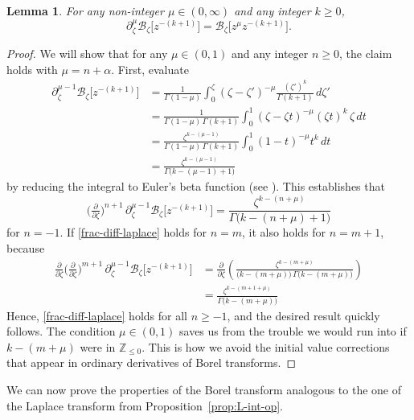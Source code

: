 \documentclass{article}
\newcommand{\Z}{\mathbb{Z}}
\newcommand{\borel}{\mathcal{B}}
\theoremstyle{definition}
\theoremstyle{plain}
\newtheorem{lemma}[definition]{Lemma}
\begin{document}
\begin{lemma}\label{lem:frac-deriv-Borel}
For any non-integer $\mu \in (0, \infty)$ and any integer $k \ge 0$,
\[ \partial^\mu_{\zeta } \borel_\zeta \big[z^{-(k+1)}\big] =  \borel_\zeta \big[z^\mu z^{-(k+1)}\big]. \]
\end{lemma}
\begin{proof}
We will show that for any $\mu \in (0, 1)$ and any integer $n \ge 0$, the claim holds with $\mu = n + \alpha$. First, evaluate
\begin{align*}
\partial^{\mu-1}_{\zeta} \borel_\zeta \big[z^{-(k+1)}\big] & = \frac{1}{\Gamma(1-\mu)} \int_0^\zeta (\zeta-\zeta')^{-\mu} \frac{(\zeta')^k}{\Gamma(k+1)}\,d\zeta' \\
& = \frac{1}{\Gamma(1-\mu)\,\Gamma(k+1)} \int_0^1 (\zeta-\zeta t)^{-\mu} (\zeta t)^k\,\zeta\,dt \\
& = \frac{\zeta^{k-(\mu-1)}}{\Gamma(1-\mu)\,\Gamma(k+1)} \int_0^1 (1-t)^{-\mu} t^k\,dt \\
& = \frac{\zeta^{k-(\mu-1)}}{\Gamma\big(k-(\mu-1)+1\big)}
\end{align*}
by reducing the integral to Euler's beta function (see \cite[Identity 5.12.1]{dlmf}). This establishes that
\begin{equation}\label{frac-diff-laplace}
\big(\tfrac{\partial}{\partial \zeta}\big)^{n+1}\,\partial^{\mu-1}_{\zeta } \borel_\zeta \big[z^{-(k+1)}\big] = \frac{\zeta^{k-(n+\mu)}}{\Gamma\big(k-(n+\mu)+1\big)}
\end{equation}
for $n = -1$. If \eqref{frac-diff-laplace} holds for $n = m$, it also holds for $n = m+1$, because
\begin{align*}
\tfrac{\partial}{\partial \zeta} \big(\tfrac{\partial}{\partial \zeta}\big)^{m+1}\,\partial^{\mu-1}_{\zeta} \borel_\zeta \big[z^{-(k+1)}\big] & = \frac{\partial}{\partial \zeta} \left( \frac{\zeta^{k-(m+\mu)}}{\big(k-(m+\mu)\big)\,\Gamma\big(k-(m+\mu)\big)} \right) \\
& = \frac{\zeta^{k-(m+1+\mu)}}{\Gamma\big(k-(m+\mu)\big)}
\end{align*}
Hence, \eqref{frac-diff-laplace} holds for all $n \ge -1$, and the desired result quickly follows. The condition $\mu \in (0, 1)$ saves us from the trouble we would run into if $k-(m+\mu)$ were in $\Z_{\le 0}$. This is how we avoid the initial value corrections that appear in ordinary derivatives of Borel transforms.
\end{proof}
We can now prove the properties of the Borel transform analogous to the one of the Laplace transform from Proposition~\ref{prop:L-int-op}.
\end{document}

